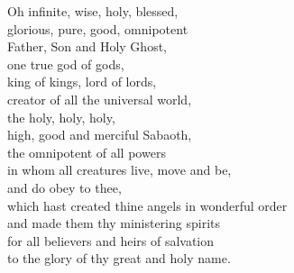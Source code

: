 \documentclass[10pt,openany]{book}
\newcommand{\prayersize}{\Large}
\newcommand{\prayerblock}[1]{%
  {\linespread{1.2}\prayersize\noindent #1\par}%
}
\begin{document}
\prayerblock{%
  Oh infinite, wise, holy, blessed,\\
  glorious, pure, good, omnipotent\\
  Father, Son and Holy Ghost,\\
  one true god of gods,\\
  king of kings, lord of lords,\\
  creator of all the universal world,\\
  the holy, holy, holy,\\
  high, good and merciful Sabaoth,\\
  the omnipotent of all powers\\
  in whom all creatures live, move and be,\\
  and do obey to thee,\\
  which hast created thine angels in wonderful order\\
  and made them thy ministering spirits\\
  for all believers and heirs of salvation\\
  to the glory of thy great and holy name.\\[8pt]
  
}
\end{document}
